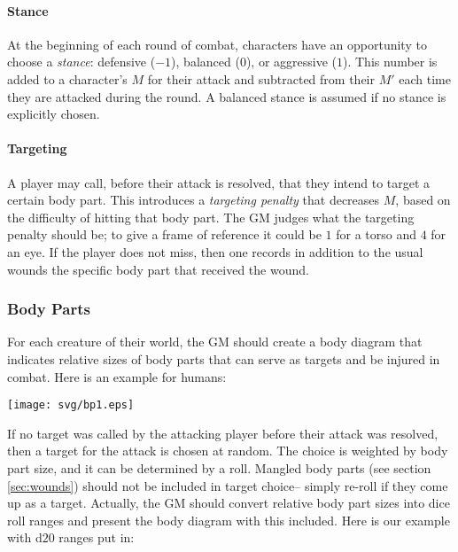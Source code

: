 \documentclass[12pt]{article}
\newcommand{\emdex}[1]{\emph{#1}\index{#1}}
\begin{document}
\paragraph{Stance}
At the beginning of each round of combat,
characters have an opportunity to choose a \emdex{stance}:
defensive ($-1$), balanced ($0$), or aggressive ($1$).
This number is added to a character's $M$ for their attack and subtracted from their
$M'$ each time they are attacked during the round.
A balanced stance is assumed if no stance is explicitly chosen.


\paragraph{Targeting}
A player may call, before their attack is resolved, that they intend to target a certain body part.
This introduces a \emdex{targeting penalty} that decreases $M$, based on the difficulty of hitting that body part.
The GM judges what the targeting penalty should be;
to give a frame of reference it could be $1$ for a torso and $4$ for an eye.
If the player does not miss, then one records in addition to the usual wounds the specific body part that received the wound.


\subsubsection{Body Parts}\label{sec:bodyparts}

For each creature of their world, the GM should create a body diagram
that indicates relative sizes of body
parts that can serve as targets and be injured in combat.
Here is an example for humans:
\begin{center} \texttt{[image: svg/bp1.eps]} \end{center}

If no target was called by the attacking player before their attack was resolved, then a target
for the attack is chosen at random. The choice is weighted by body part size,
and it can be determined by a roll.
Mangled body parts (see section \ref{sec:wounds}) should not be included in target choice--
simply re-roll if they come up as a target.
Actually, the GM should convert relative body part sizes into dice roll ranges
and present the body diagram with this included.
Here is our example with d$20$ ranges put in:
\end{document}
